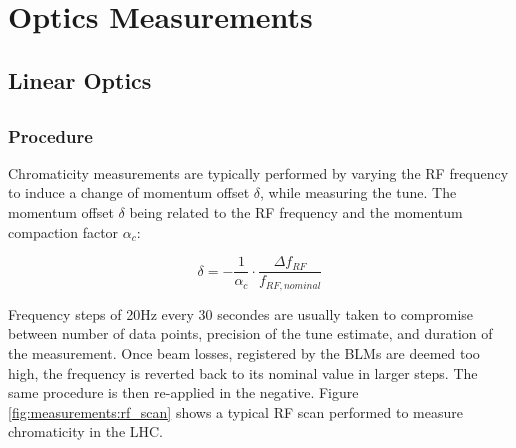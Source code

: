 \section{Optics Measurements}



\subsection{Linear Optics}




\subsection{}

\subsubsection{Procedure}

Chromaticity measurements are typically performed by varying the RF frequency to induce a change of
momentum offset $\delta$, while measuring the tune.  The momentum offset $\delta$ being related to
the RF frequency and the momentum compaction factor $\alpha_c$:

\begin{equation}
    \delta = - \frac{1}{\alpha_c} \cdot \frac{\Delta f_{RF}}{f_{RF,nominal}}
    \label{eq:dpp_rf}
\end{equation}

Frequency steps of 20Hz every 30 secondes are usually taken to compromise between number of data
points, precision of the tune estimate, and duration of the measurement. Once beam losses,
registered by the BLMs are deemed too high, the frequency is reverted back to its nominal value in
larger steps. The same procedure is then re-applied in the negative. Figure
\ref{fig:measurements:rf_scan} shows a typical RF scan performed to measure chromaticity in the LHC.


